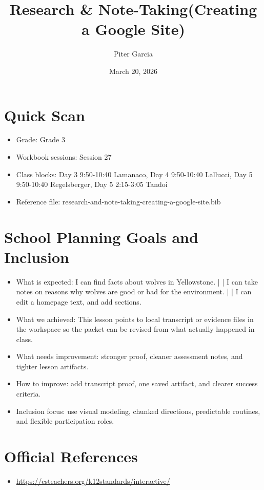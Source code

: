 \documentclass[11pt]{article}
\title{Research & Note-Taking(Creating a Google Site)}
\author{Piter Garcia}
\date{March 20, 2026}
\begin{document}
\maketitle
\section*{Quick Scan}
\begin{itemize}[leftmargin=*]
\item Grade: Grade 3
\item Workbook sessions: Session 27
\item Class blocks: Day 3 9:50-10:40 Lamanaco, Day 4 9:50-10:40 Lallucci, Day 5 9:50-10:40 Regelsberger, Day 5 2:15-3:05 Tandoi
\item Reference file: research-and-note-taking-creating-a-google-site.bib
\end{itemize}
\section*{School Planning Goals and Inclusion}
\begin{itemize}[leftmargin=*]
\item What is expected: I can find facts about wolves in Yellowstone. | | I can take notes on reasons why wolves are good or bad for the environment. | | I can edit a homepage text, and add sections.
\item What we achieved: This lesson points to local transcript or evidence files in the workspace so the packet can be revised from what actually happened in class.
\item What needs improvement: stronger proof, cleaner assessment notes, and tighter lesson artifacts.
\item How to improve: add transcript proof, one saved artifact, and clearer success criteria.
\item Inclusion focus: use visual modeling, chunked directions, predictable routines, and flexible participation roles.
\end{itemize}
\section*{Official References}
\begin{itemize}[leftmargin=*]
\item \url{https://csteachers.org/k12standards/interactive/}

\end{itemize}
\end{document}
